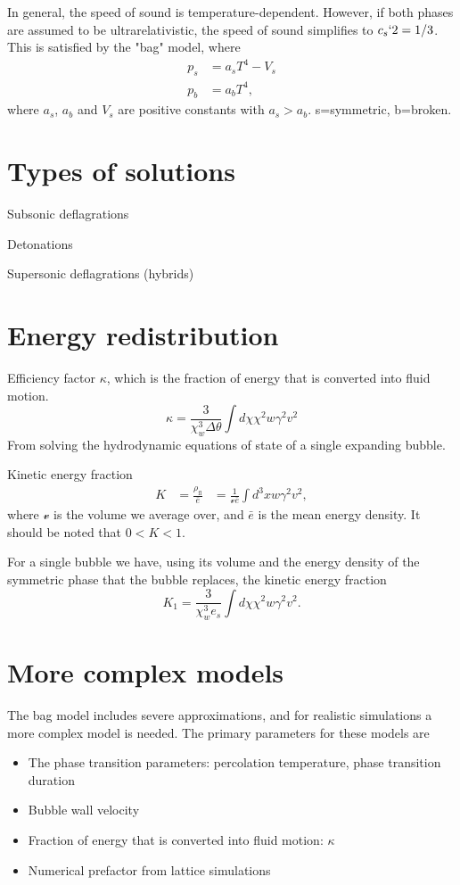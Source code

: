 In general, the speed of sound is temperature-dependent.
However, if both phases are assumed to be ultrarelativistic, the speed of sound simplifies to $c_s`2 = 1/3$.
This is satisfied by the "bag" model, where
\begin{align}
p_s &= a_s T^4 - V_s \\
p_b &= a_b T^4,
\end{align}
where $a_s$, $a_b$ and $V_s$ are positive constants with $a_s > a_b$.
s=symmetric, b=broken.

\section{Types of solutions}
Subsonic deflagrations

Detonations

Supersonic deflagrations (hybrids)

\section{Energy redistribution}
Efficiency factor $\kappa$, which is the fraction of energy that is converted into fluid motion.
\begin{equation}
\kappa = \frac{3}{\chi_w^3 \Delta \theta} \int d\chi \chi^2 w \gamma^2 v^2
\end{equation}
From solving the hydrodynamic equations of state of a single expanding bubble.

Kinetic energy fraction
\cites[eq. 7.36]{lecture_notes}[eq. 5]{giese_2020}
\begin{align}
K
&= \frac{\rho_\text{fl}}{\bar{e}}
&= \frac{1}{\mathcal{v} \bar{e}} \int d^3 x w \gamma^2 v^2,
\end{align}
where $\mathcal{v}$ is the volume we average over, and $\bar{e}$ is the mean energy density.
It should be noted that $0 < K < 1$.
\cite{giese_2020}

For a single bubble we have, using its volume and the energy density of the symmetric phase that the bubble replaces, the kinetic energy fraction
\cites[eq. 7.37]{lecture_notes}[eq. 5]{giese_2020}
\begin{equation}
K_1 = \frac{3}{\chi_w^3 e_s} \int d\chi \chi^2 w \gamma^2 v^2.
\end{equation}

\section{More complex models}
The bag model includes severe approximations, and for realistic simulations a more complex model is needed.
The primary parameters for these models are
\begin{itemize}
    \item The phase transition parameters: percolation temperature, phase transition duration
    \item Bubble wall velocity
    \item Fraction of energy that is converted into fluid motion: $\kappa$
    \item Numerical prefactor from lattice simulations
\end{itemize}

